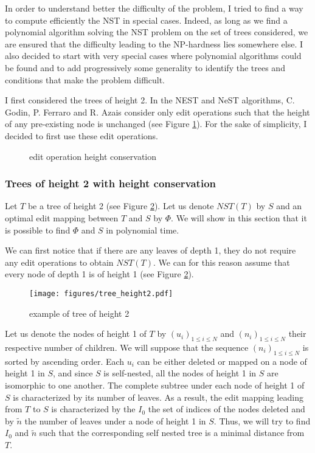 In order to understand better the difficulty of the problem, I tried
to find a way to compute efficiently the NST in special cases. Indeed,
as long as we find a polynomial algorithm solving the NST problem on
the set of trees considered, we are ensured that the difficulty
leading to the NP-hardness lies somewhere else. I also decided to
start with very special cases where polynomial algorithms could be found
and to add progressively some generality to identify the trees and
conditions that make the problem difficult. 

I first considered the trees of height 2. In the NEST and NeST
algorithms, C. Godin, P. Ferraro and R. Azais consider only edit
operations such that the height of any pre-existing node is unchanged
(see Figure \ref{fig:edit_height}). For the sake of simplicity, I
decided to first use these edit operations.

\begin{figure}
  \centering
  \caption{edit operation height conservation}
  \label{fig:edit_height}
\end{figure}

\subsubsection{Trees of height 2 with height conservation} 
Let $T$ be a tree of height 2 (see Figure \ref{fig:height2}). Let us
denote $NST(T)$ by $S$ and an optimal edit mapping between $T$ and $S$
by $\Phi$. We will show in this section that it is possible to find
$\Phi$ and $S$ in polynomial time.  

We can first notice that if there are any leaves of depth 1, they do
not require any edit operations to obtain $NST(T)$. We can for this
reason assume that every node of depth 1 is of height 1 (see Figure
\ref{fig:height2}).

\begin{figure}
  \centering
  \texttt{[image: figures/tree\_height2.pdf]}

  \caption{example of tree of height 2}
  \label{fig:height2}
\end{figure}

Let us denote the nodes of height 1 of $T$ by
$(u_{i})_{1 \leqslant i \leqslant N}$ and
$(n_{i})_{1 \leqslant i \leqslant N}$ their respective number of
children. We will suppose that the sequence
$(n_{i})_{1 \leqslant i \leqslant N}$ is sorted by ascending
order. Each $u_{i}$ can be either deleted or mapped on a node of
height 1 in $S$, and since $S$ is self-nested, all the nodes of height
1 in $S$ are isomorphic to one another. The complete subtree under
each node of height 1 of $S$ is characterized by its number of
leaves. As a result, the edit mapping leading from $T$ to $S$ is
characterized by the $I_{0}$ the set of indices of the nodes deleted
and by $\tilde{n}$ the number of leaves under a node of height 1 in
$S$. Thus, we will try to find $I_{0}$ and $\tilde{n}$ such that the
corresponding self nested tree is a minimal distance from $T$.

